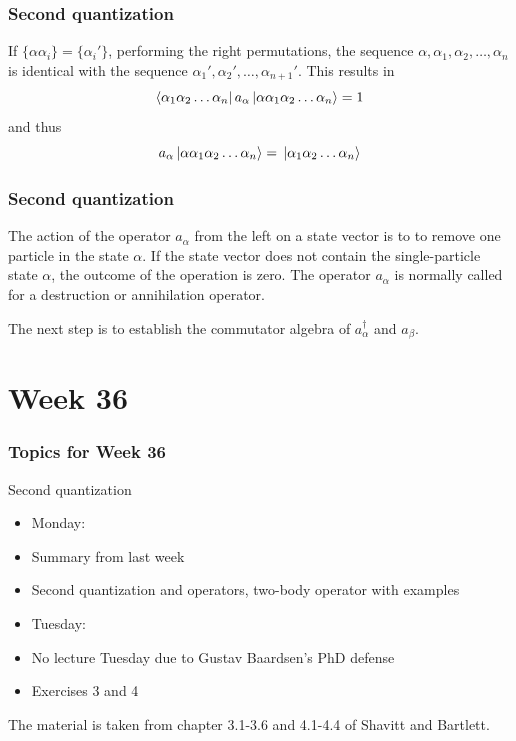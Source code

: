 \frame
{
  \frametitle{Second quantization}
\begin{small}
{\scriptsize
If $\{\alpha\alpha_i\} = \{\alpha_i'\}$, performing the right permutations, the sequence
$\alpha ,\alpha_1, \alpha_2, \dots, \alpha_n$ is identical with the sequence
$\alpha_1', \alpha_2', \dots, \alpha_{n+1}'$. This results in
\begin{equation}
	\element{\alpha_1\alpha_2 \dots \alpha_n}{a_\alpha}{\alpha\alpha_1\alpha_2 \dots \alpha_{n}} = 1 \label{eq:2-14}
\end{equation}
and thus
\begin{equation}
	a_\alpha \ket{\alpha\alpha_1\alpha_2 \dots \alpha_{n}} = \ket{\alpha_1\alpha_2 \dots \alpha_{n}} \label{eq:2-15}
\end{equation}
}
\end{small}
}

\frame
{
  \frametitle{Second quantization}
\begin{small}
{\scriptsize
The action of the operator 
$a_\alpha$ from the left on a state vector  is to to remove  one particle in the state
$\alpha$. 
If the state vector does not contain the single-particle state $\alpha$, the outcome of the operation is zero.
The operator  $a_\alpha$ is normally called for a destruction or annihilation operator.

The next step is to establish the  commutator algebra of $a_\alpha^\dagger$ and
$a_\beta$. 
}
\end{small}
}


\section[Week 36]{Week 36}
\frame
{
  \frametitle{Topics for Week 36}
  \begin{block}{Second quantization}
\begin{itemize}
\item Monday:
\item Summary from last week
\item Second quantization and operators, two-body operator with examples 
\item Tuesday:
\item No lecture Tuesday due to Gustav Baardsen's PhD defense
\item Exercises 3 and 4
\end{itemize}
The material is taken from chapter 3.1-3.6 and 4.1-4.4 of Shavitt and Bartlett. 
  \end{block}
} 




